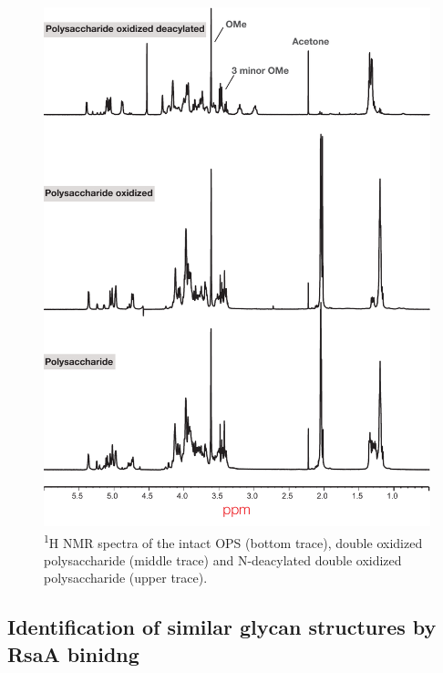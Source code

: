         \begin{figure}[ph] %
          \begin{center}
            \includegraphics[height=0.9\textheight]{lps_chapter/img/lpsfig1.pdf}
          \end{center}
          \caption[\textsuperscript{1}H \ac{NMR} spectra of \caulobacter{} \ac{OPS}]{\textsuperscript{1}H
            \ac{NMR} spectra of the intact \caulobacter{} \ac{OPS} (bottom trace), double oxidized
            polysaccharide (middle trace) and N-deacylated double oxidized polysaccharide (upper trace).}
          \label{fig:lpsfig1}
        \end{figure}

        \subsection{Identification of similar glycan structures by RsaA binidng} \label{sec:ident-simil-glyc}
  
